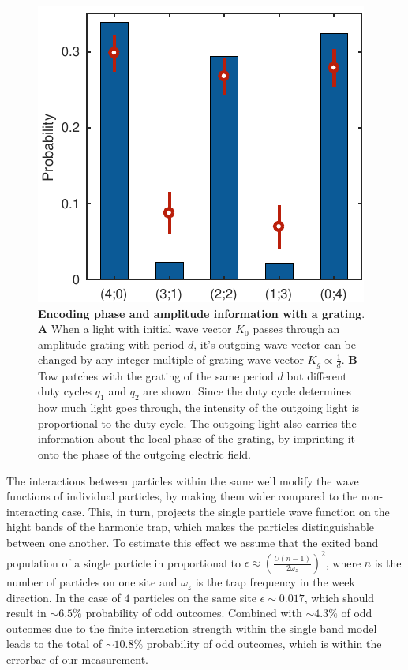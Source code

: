 \begin{figure}[t]
	\centering
	\includegraphics[scale=1]{figures/CBH_HOM_4particles.pdf}
	\caption{{\bf Encoding phase and amplitude information with a grating}. {\bf A} When a light with initial wave vector $K_0$ passes through an amplitude grating with period $d$, it's outgoing wave vector can be changed by any integer multiple of grating wave vector $K_g\propto \frac{1}{d}$. {\bf B} Tow patches with the grating of the same period $d$ but different duty cycles $q_1$ and $q_2$ are shown. Since the duty cycle determines how much light goes through, the intensity of the outgoing light is proportional to the duty cycle. The outgoing light also carries the information about the local phase of the grating, by imprinting it onto the phase of the outgoing electric field.}
	\label{fig:CBH_4particles}
\end{figure}

The interactions between particles within the same well modify the wave functions of individual particles, by making them wider compared to the non-interacting case. This, in turn, projects the single particle wave function on the hight bands of the harmonic trap, which makes the particles distinguishable between one another. To estimate this effect we assume that the exited band population of a single particle in proportional to $\epsilon \approx (\frac{U(n-1)}{2 \omega_z})^2$, where $n$ is the number of particles on one site and $\omega_z$ is the trap frequency in the week direction. In the case of $4$ particles on the same site $\epsilon\sim0.017$, which should result in $\sim 6.5\%$ probability of odd outcomes. Combined with $\sim 4.3\%$ of odd outcomes due to the finite interaction strength within the single band model leads to the total of $\sim 10.8\%$ probability of odd outcomes, which is within the errorbar of our measurement.

